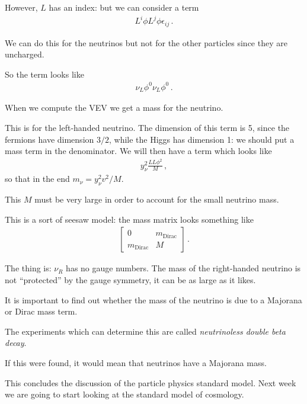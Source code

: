 \documentclass[main.tex]{subfiles}
\begin{document}
However, \(L\) has an index: but we can consider a term 
%
\begin{align}
L^{i} \phi L^{j} \phi \epsilon_{ij}
\,.
\end{align}

We can do this for the neutrinos but not for the other particles since they are uncharged. 

So the term looks like 
%
\begin{align}
\nu_{L} \phi^{0} \nu_{L} \phi^{0}
\,.
\end{align}

When we compute the VEV we get a mass for the neutrino. 

This is for the left-handed neutrino. The dimension of this term is 5, since the fermions have dimension \(3/2\), while the Higgs has dimension 1: we should put a mass term in the denominator.
We will then have a term which looks like 
%
\begin{align}
y^2_{\nu } \frac{L L \phi^2}{M}
\,,
\end{align}
%
so that in the end \(m_{\nu } = y^2_{\nu } v^2 / M\).

This \(M\) must be very large in order to account for the small neutrino mass.

This is a sort of seesaw model: the mass matrix looks something like 
%
\begin{subequations}
\begin{align}
\left[\begin{array}{cc}
0 & m _{\text{Dirac}} \\ 
m _{\text{Dirac}} & M
\end{array}\right]
\,.
\end{align}
\end{subequations}

The thing is: \(\nu_{R}\) has no gauge numbers. 
The mass of the right-handed neutrino is not ``protected'' by the gauge symmetry, it can be as large as it likes. 


It is important to find out whether the mass of the neutrino is due to a Majorana or Dirac mass term.

The experiments which can determine this are called \emph{neutrinoless double beta decay}.

If this were found, it would mean that neutrinos have a Majorana mass.

This concludes the discussion of the particle physics standard model. Next week we are going to start looking at the standard model of cosmology.
\end{document}
